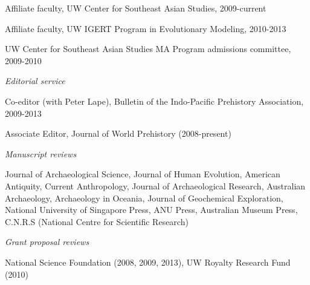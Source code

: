 \ind Affiliate faculty, UW Center for Southeast Asian Studies, 2009-current

\ind Affiliate faculty, UW IGERT Program in Evolutionary Modeling, 2010-2013

\ind UW Center for Southeast Asian Studies MA Program admissions committee, 2009-2010



\medskip

\noindent\emph{Editorial service\vspace{0.01in}}

\medskip

\ind Co-editor (with Peter Lape), Bulletin of the Indo-Pacific Prehistory Association, 2009-2013

\ind Associate Editor, Journal of World Prehistory (2008-present)

\vspace{0.05in}

\noindent\emph{Manuscript reviews\vspace{0.01in}}

\medskip

\noindent Journal of Archaeological Science, Journal of Human Evolution, American Antiquity, Current Anthropology, Journal of Archaeological Research, Australian Archaeology, Archaeology in Oceania, Journal of Geochemical Exploration, National University of Singapore Press, ANU Press, Australian Museum Press, C.N.R.S (National Centre for Scientific Research)

 \vspace{0.05in}
 \medskip

\noindent\emph{Grant proposal reviews\vspace{0.01in}}

\medskip

\noindent National Science Foundation (2008, 2009, 2013), UW Royalty Research Fund (2010)
